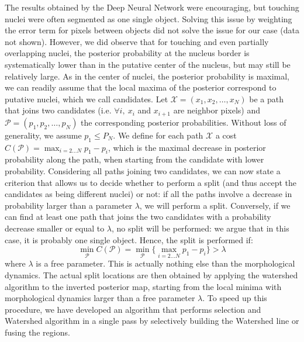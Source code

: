 \documentclass{article}
\begin{document}
The results obtained by the Deep Neural Network were encouraging, but
touching nuclei were often segmented as one single object. 
Solving this issue by weighting the
error term for pixels between objects did not solve the issue for our
case (data not shown). However, we did observe that for touching and
even partially overlapping nuclei, the posterior probability at the
nucleus border is systematically lower than in
the putative center of the nucleus, but may still be relatively
large. As in the center of nuclei, the
posterior probability is maximal, we can readily assume that the local
maxima of the posterior correspond to putative nuclei, which we call candidates. Let
$\mathcal{X}=(x_1,x_2,\ldots,x_N)$ be a path that joins two candidates
(i.e. $\forall i, \ x_i$ and $x_{i+1}$ are neighbor pixels) and
$\mathcal{P}=(p_1,p_2,\ldots,p_N)$ the corresponding posterior
probabilities. Without loss of generality, we assume $p_1\leq P_N$.
We define for each path $\mathcal{X}$ a cost
$C(\mathcal{P})=\max_{i=2 \ldots N}{p_1-p_i}$, which is the maximal
decrease in posterior probability along the path, when starting from
the candidate with lower probability.  Considering all paths joining two
candidates, we can now state a criterion that allows us to decide whether to
perform a split (and thus accept the candidates as being different
nuclei) or not: if all the paths involve a decrease in probability
larger than a parameter $\lambda$, we will perform a
split. Conversely, if we can find at least one path that joins the two candidates
with a probability decrease smaller or equal to $\lambda$, no split
will be performed: we argue that in this case, it is probably one
single object. Hence, the split is performed if: 
\begin{equation*}
\min_{\mathcal{P}}C(\mathcal{P}) = \min_{\mathcal{P}} \{\max_{i=2
  \ldots N}{p_1-p_i}\} > \lambda
\end{equation*}
where $\lambda$ is a free parameter. This is actually nothing else
than the morphological dynamics\cite{Grimaud1992}. The actual split
locations are then obtained by applying the watershed algorithm to the
inverted posterior map,
starting from the local minima with morphological dynamics larger than
a free parameter $\lambda$. To speed up this procedure, we have developed an algorithm that
performs selection and Watershed algorithm in a single pass by
selectively building the Watershed line or fusing the regions.
\end{document}
